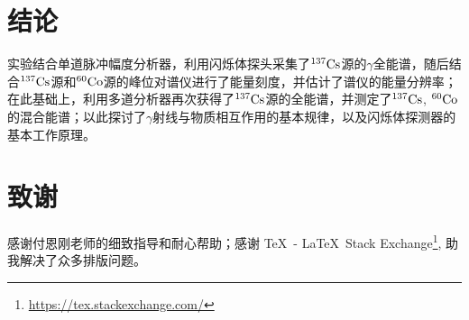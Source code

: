 \documentclass[aps,pre,12pt,preprint,%
	onecolumn,showpacs,showkeys,nofootinbib]{revtex4-1}
\newcommand{\naItl}{\tup{NaI\,(Tl)}}
\newcommand{\csAtom}{${}^{137}\mrm{Cs}$}
\newcommand{\coAtom}{${}^{60}\mrm{Co}$}
\begin{document}
\section{结论}
	实验结合单道脉冲幅度分析器，利用\naItl 闪烁体探头采集了\csAtom 源的$\gamma$全能谱，随后结合\csAtom 源和\coAtom 源的峰位对谱仪进行了能量刻度，并估计了谱仪的能量分辨率；在此基础上，利用多道分析器再次获得了\csAtom 源的全能谱，并测定了\csAtom, \coAtom 的混合能谱；以此探讨了$\gamma$射线与物质相互作用的基本规律，以及闪烁体探测器的基本工作原理。
\vspace{-.5\baselineskip}
\section{致谢}
	感谢付恩刚老师的细致指导和耐心帮助；感谢 \TeX\, - \LaTeX\, Stack Exchange\footnote{%
		\url{https://tex.stackexchange.com/}
	}, 助我解决了众多排版问题。

\vspace{.8\baselineskip}

\setlength{\bibsep}{1ex}
\linespread{1.}\selectfont

%

\clearpage


\linespread{1.5}\selectfont
\appendix
\end{document}
